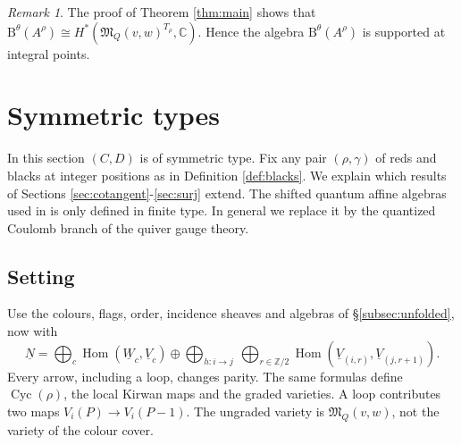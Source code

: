 \documentclass[11pt,reqno]{amsart}
\theoremstyle{definition}
\theoremstyle{remark}
\newtheorem{Remark}[Theorem]{Remark}
\def\bbC{\mathbb C}
\def\bbZ{\mathbb Z}
\def\dN{\underline N}
\def\dV{\underline V}
\def\dW{\underline W}
\def\B{\mathrm B}
\def\Hom{\operatorname{Hom}}
\def\Cyc{\operatorname{Cyc}}
\def\M{\mathfrak M}
\begin{document}
\begin{Remark}
The proof of Theorem \ref{thm:main} shows that 
$\B^\theta(A^\rho)\cong H^*(\M_Q(v,w)^{T_\rho},\bbC).$ 
Hence the algebra $\B^\theta(A^\rho)$ is supported at integral points.
\end{Remark}




\section{Symmetric types}\label{sec:general}

In this section $(C,D)$ is of symmetric type.
Fix any pair $(\rho,\gamma)$ of reds and blacks
at integer positions as in Definition \ref{def:blacks}. 
We explain which results of Sections \ref{sec:cotangent}-\ref{sec:surj} extend. 
The shifted quantum affine algebras used in \cite{VVsh} is only defined in finite type.
In general we replace it by the quantized Coulomb branch of the quiver gauge theory.

\subsection{Setting}\label{subsec:gen-setting}
Use the colours, flags, order, incidence sheaves and algebras of
\S\ref{subsec:unfolded}, now with
\[
 \dN=\bigoplus_c\Hom(\dW_c,\dV_c)\oplus
 \bigoplus_{h:i\to j}\ \bigoplus_{r\in\bbZ/2}
 \Hom(\dV_{(i,r)},\dV_{(j,r+1)}).
\]
Every arrow, including a loop, changes parity. The same formulas
define $\Cyc(\rho)$, the local Kirwan maps and the graded varieties.
A loop contributes two maps $V_i(P)\to V_i(P-1)$.
The ungraded variety is $\M_Q(v,w)$, not the variety of the colour cover.
\end{document}
